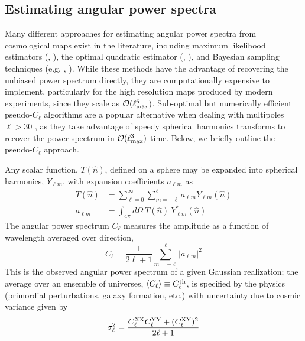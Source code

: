 \documentclass[a4paper,usenatbib]{mnras}
\begin{document}
\subsection{Estimating angular power spectra}

Many different approaches for estimating angular power spectra from cosmological maps exist in the literature, including maximum likelihood estimators (\citealt{Bond++98}, \citealt{WandeltHansen03}), the optimal quadratic estimator (\citealt{Tegmark97}, \citealt{Tegmark++01}), and Bayesian sampling techniques (e.g. \citealt{Eriksen++04}, \citealt{Taylor++08}). While these methods have the advantage of recovering the unbiased power spectrum directly, they are computationally expensive to implement, particularly for the high resolution maps produced by modern experiments, since they scale as $\mathcal{O}(\ell_{\rm max}^6)$. Sub-optimal but numerically efficient pseudo-$C_{\ell}$ algorithms \citep{MASTER} are a popular alternative when dealing with multipoles $\ell > 30$ \citep{Efstathiou04a}, as they take advantage of speedy spherical harmonics transforms to recover the power spectrum in $\mathcal{O}(\ell_{\rm max}^3)$ time. Below, we briefly outline the pseudo-$C_{\ell}$ approach.

Any scalar function, $T(\hat{n})$, defined on a sphere may be expanded into spherical harmonics, $Y_{\ell m}$, with expansion coefficients $a_{\ell m}$ as
\begin{align}
    T(\hat{n}) &= \sum_{\ell=0}^{\infty} \sum_{m=-\ell}^{\ell} a_{\ell m} Y_{\ell m}(\hat{n}) \\ 
    a_{\ell m} &= \int_{4\pi}d\Omega \ T(\hat{n}) \ Y^{*}_{\ell m}(\hat{n})
\end{align}
The angular power spectrum $C_{\ell}$ measures the amplitude as a function of wavelength averaged over direction,
\begin{equation}
    C_{\ell} = \frac{1}{2\ell + 1}\sum_{m=-\ell}^{\ell} |a_{\ell m}|^2
\end{equation}
This is the observed angular power spectrum of a given Gaussian realization; the average over an ensemble of universes, $\langle C_{\ell} \rangle \equiv C_{\ell}^{\rm th}$, is specified by the physics (primordial perturbations, galaxy formation, etc.) with uncertainty due to cosmic variance given by
\begin{align}
    \sigma_{\ell}^2 = \frac{C^{\rm XX}_{\ell}C^{\rm YY}_{\ell} + (C^{\rm XY}_{\ell})^2}{2\ell + 1}
\end{align}
\end{document}
